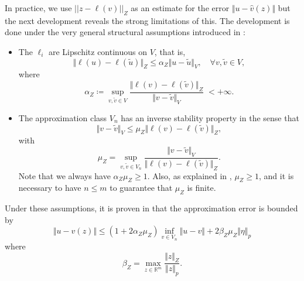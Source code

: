 \documentclass[11pt,a4paper,twoside]{article}
\theoremstyle{definition}
\numberwithin{equation}{section}
\newcommand{\bR}{\ensuremath{\mathbb{R}}}
\newcommand{\<}{\langle}
\renewcommand{\>}{\rangle}
\begin{document}
In practice, we use $|| z - \ell(v) ||_Z$ as an estimate for the error $\Vert u - \hat v(z) \Vert$ but the next development reveals the strong limitations of this. The development is done under the very general structural assumptions introduced in \cite{CDMS2023}:

\begin{itemize}
\item The $\ell_i$ are Lipschitz continuous on $V$, that is,
\begin{equation}
\label{eq:struct1}
\Vert \ell(u) - \ell(\tilde u) \Vert_Z \leq \alpha_Z \Vert u - \tilde u \Vert_V, \quad \forall v, \tilde v \in V,
\end{equation}
where
$$
\alpha_Z \coloneqq \sup_{v, \tilde v \in V}
\frac{ \Vert \ell(v) - \ell(\tilde v) \Vert_Z }{ \Vert v - \tilde v \Vert_V} \; <+\infty .
$$
\item The approximation class $V_n$ has an inverse stability property in the sense that
\begin{equation}
      \label{eq:struct2}
\Vert v - \tilde v \Vert_V
\leq
\mu_Z \Vert \ell(v) - \ell(\tilde v) \Vert_Z,
\end{equation}
with
$$
\mu_Z = \sup_{v, \tilde v \in V_n}
\frac{ \Vert v - \tilde v \Vert_V }{ \Vert \ell(v) - \ell(\tilde v) \Vert_Z}.
$$
Note that we always have $\alpha_Z\mu_Z \geq 1$. Also, as explained in \cite{CDMS2023}, $\mu_Z\geq 1$, and it is necessary to have $n\leq m$ to guarantee that $\mu_Z$ is finite.
\end{itemize}
Under these assumptions, it is proven in \cite{} that the approximation error is
bounded by
$$
\Vert u - \hat v(z) \Vert \leq (1+2\alpha_Z \mu_Z) \inf_{v\in V_n} \Vert u - v \Vert + 2 \beta_Z \mu_Z \Vert \eta \Vert_p
$$
where
$$
\beta_Z = \max_{z\in \bR^m} \frac{\Vert z \Vert_Z}{\Vert z \Vert_p}.
$$
\end{document}

